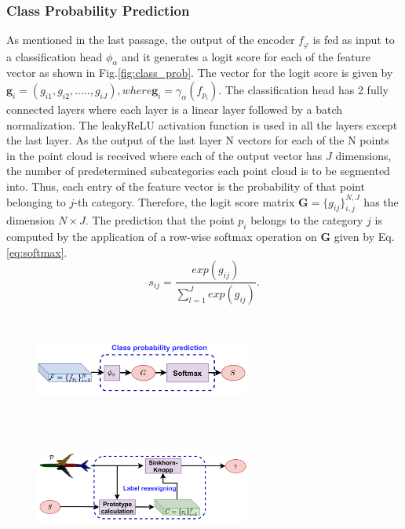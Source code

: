 \subsubsection*{Class Probability Prediction}
As mentioned in the last passage, the output of the encoder $f_{\varphi}$ is fed as input to a classification head $\phi_\alpha$ and it generates a logit score for each of the feature vector as shown in Fig.\ref{fig:class_prob}. The vector for the logit score is given by $\textbf{g}_i = (g_{i1}, g_{i2},....., g_{iJ}), where \textbf{g}_i = \gamma_\alpha(f_{p_i})$. The classification head has 2 fully connected layers where each layer is a linear layer followed by a batch normalization. The leakyReLU activation function is used in all the layers except the last layer. As the output of the last layer N vectors for each of the N points in the point cloud is received where each of the output vector has $J$ dimensions, the number of predetermined subcategories each point cloud is to be segmented into. Thus, each entry of the feature vector is the probability of that point belonging to $j$-th category. Therefore, the logit score matrix $\textbf{G} = \{ g_{ij}\}_{i,j}^{N,J}$ has the dimension $N \times J$. The prediction that the point $p_i$ belongs to the category $j$ is computed by the application of a row-wise softmax operation on $\textbf{G}$ given by Eq.\ref{eq:softmax}.
\begin{equation}
    \label{eq:softmax}
    \mathit{s_{ij}}= \mathit{\frac{exp(g_{ij})}{\sum_{l=1}^{J}exp(g_{ij})}}. 
\end{equation}

\begin{figure}
    \centering
    \begin{minipage}[t]{.45\textwidth}
      \centering
      \includegraphics[width=200pt,height=100pt]{pictures/class_prob.jpg}
      \label{fig:class_prob}
    \end{minipage}%
    \hspace{1cm}
    \begin{minipage}[t]{.45\textwidth}
      \centering
      \includegraphics[width=200pt,height=100pt]{pictures/label_reassign.jpg}
      \label{fig:label_reassign}
    \end{minipage}
\end{figure}

